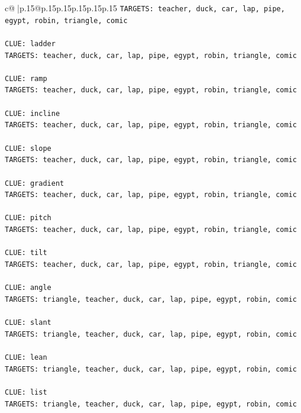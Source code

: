 \documentclass{article}
\begin{document}
{\begin{supertabular}{c@{$\;$}|p{.15\linewidth}@{}p{.15\linewidth}p{.15\linewidth}p{.15\linewidth}p{.15\linewidth}p{.15\linewidth}}
{{{\texttt{TARGETS: teacher, duck, car, lap, pipe, egypt, robin, triangle, comic} \\
\\ 
\texttt{CLUE: ladder} \\
\texttt{TARGETS: teacher, duck, car, lap, pipe, egypt, robin, triangle, comic} \\
\\ 
\texttt{CLUE: ramp} \\
\texttt{TARGETS: teacher, duck, car, lap, pipe, egypt, robin, triangle, comic} \\
\\ 
\texttt{CLUE: incline} \\
\texttt{TARGETS: teacher, duck, car, lap, pipe, egypt, robin, triangle, comic} \\
\\ 
\texttt{CLUE: slope} \\
\texttt{TARGETS: teacher, duck, car, lap, pipe, egypt, robin, triangle, comic} \\
\\ 
\texttt{CLUE: gradient} \\
\texttt{TARGETS: teacher, duck, car, lap, pipe, egypt, robin, triangle, comic} \\
\\ 
\texttt{CLUE: pitch} \\
\texttt{TARGETS: teacher, duck, car, lap, pipe, egypt, robin, triangle, comic} \\
\\ 
\texttt{CLUE: tilt} \\
\texttt{TARGETS: teacher, duck, car, lap, pipe, egypt, robin, triangle, comic} \\
\\ 
\texttt{CLUE: angle} \\
\texttt{TARGETS: triangle, teacher, duck, car, lap, pipe, egypt, robin, comic} \\
\\ 
\texttt{CLUE: slant} \\
\texttt{TARGETS: triangle, teacher, duck, car, lap, pipe, egypt, robin, comic} \\
\\ 
\texttt{CLUE: lean} \\
\texttt{TARGETS: triangle, teacher, duck, car, lap, pipe, egypt, robin, comic} \\
\\ 
\texttt{CLUE: list} \\
\texttt{TARGETS: triangle, teacher, duck, car, lap, pipe, egypt, robin, comic} \\
}}}
\end{supertabular}}
\end{document}
